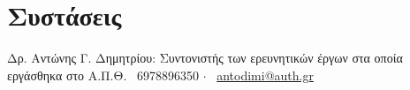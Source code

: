 \documentclass[a4paper,10pt,twoside]{article}
\begin{document}
\section{Συστάσεις}
Δρ. Αντώνης Γ. Δημητρίου: Συντονιστής των ερευνητικών έργων στα οποία εργάσθηκα στο Α.Π.Θ. \hspace{1cm}
\faPhone \ 6978896350 $\cdot$ \faEnvelopeO \ \href{mailto:antodimi@auth.gr}{antodimi@auth.gr} \\




\end{document}
